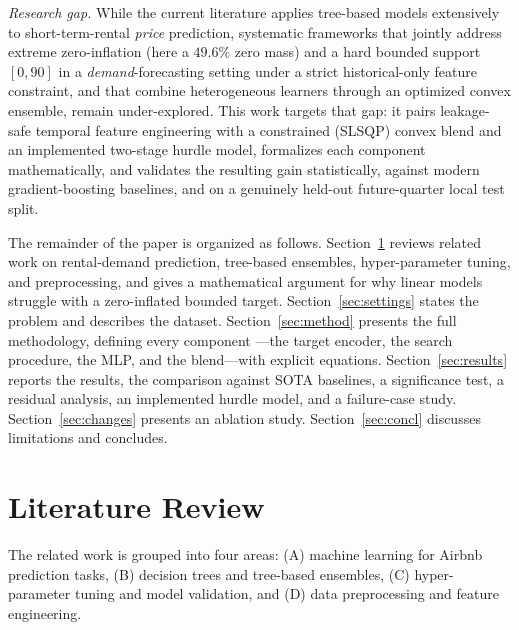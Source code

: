 \documentclass[journal]{IEEEtran}
\begin{document}
\emph{Research gap.} While the current literature applies tree-based models
extensively to short-term-rental \emph{price} prediction, systematic frameworks
that jointly address extreme zero-inflation (here a $49.6\%$ zero mass) and a
hard bounded support $[0,90]$ in a \emph{demand}-forecasting setting under a
strict historical-only feature constraint, and that combine heterogeneous
learners through an optimized convex ensemble, remain under-explored. This work
targets that gap: it pairs leakage-safe temporal feature engineering with a
constrained (SLSQP) convex blend and an implemented two-stage hurdle model,
formalizes each component mathematically, and validates the resulting gain
statistically, against modern gradient-boosting baselines, and on a genuinely
held-out future-quarter local test split.

The remainder of the paper is organized as follows. Section~\ref{sec:lit}
reviews related work on rental-demand prediction, tree-based ensembles,
hyper-parameter tuning, and preprocessing, and gives a mathematical argument for
why linear models struggle with a zero-inflated bounded target.
Section~\ref{sec:settings} states the problem and describes the dataset.
Section~\ref{sec:method} presents the full methodology, defining every component
---the target encoder, the search procedure, the MLP, and the blend---with
explicit equations. Section~\ref{sec:results} reports the results, the
comparison against SOTA baselines, a significance test, a residual analysis, an
implemented hurdle model, and a failure-case study. Section~\ref{sec:changes}
presents an ablation study. Section~\ref{sec:concl} discusses limitations and
concludes.

\section{Literature Review}
\label{sec:lit}
The related work is grouped into four areas: (A) machine learning for Airbnb
prediction tasks, (B) decision trees and tree-based ensembles, (C)
hyper-parameter tuning and model validation, and (D) data preprocessing and
feature engineering.
\end{document}
